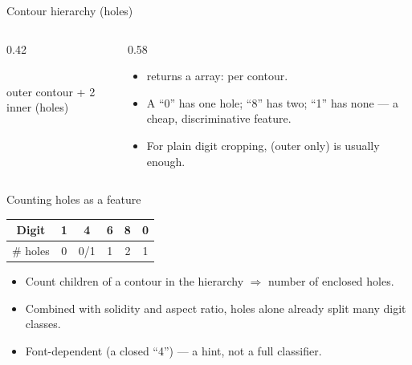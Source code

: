 \documentclass[10pt,aspectratio=169]{beamer}
\begin{document}
\begin{frame}{Contour hierarchy (holes)}
  \begin{columns}[T]
    \begin{column}{0.42\textwidth}
    \begin{center}
    \\{\scriptsize outer contour + 2 inner (holes)}
    \end{center}
    \end{column}
    \begin{column}{0.58\textwidth}
      \begin{itemize}\scriptsize
        \item {} returns a  array:  per contour.
        \item A ``0'' has one hole; ``8'' has two; ``1'' has none — a cheap, discriminative feature.
        \item For plain digit cropping,  (outer only) is usually enough.
      \end{itemize}
    \end{column}
  \end{columns}
\end{frame}

\begin{frame}{Counting holes as a feature}
  \begin{center}\scriptsize
  \begin{tabular}{@{}cccccc@{}}
    \toprule
    Digit & 1 & 4 & 6 & 8 & 0 \\
    \midrule
    \# holes & 0 & 0/1 & 1 & 2 & 1 \\
    \bottomrule
  \end{tabular}
  \end{center}
  \begin{itemize}
    \item Count children of a contour in the hierarchy $\Rightarrow$ number of enclosed holes.
    \item Combined with solidity and aspect ratio, holes alone already split many digit classes.
    \item Font-dependent (a closed ``4'') — a hint, not a full classifier.
  \end{itemize}
\end{frame}
\end{document}

